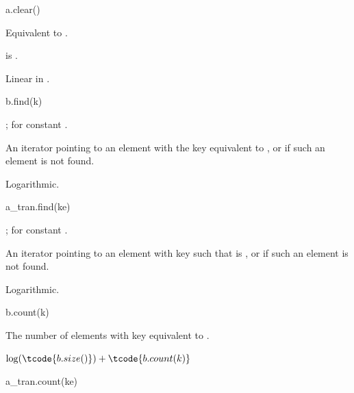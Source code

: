 %
\begin{itemdecl}
a.clear()
\end{itemdecl}

\begin{itemdescr}
\pnum
\effects
Equivalent to .

\pnum
\ensures
{} is .

\pnum
\complexity
Linear in .
\end{itemdescr}

%
\begin{itemdecl}
b.find(k)
\end{itemdecl}

\begin{itemdescr}
\pnum
\result
{};  for constant .

\pnum
\returns
An iterator pointing to an element with the key equivalent to , or
 if such an element is not found.

\pnum
\complexity
Logarithmic.
\end{itemdescr}

%
\begin{itemdecl}
a_tran.find(ke)
\end{itemdecl}

\begin{itemdescr}
\pnum
\result
{};  for constant .

\pnum
\returns
An iterator pointing to an element with key 
such that  is , or
 if such an element is not found.

\pnum
\complexity
Logarithmic.
\end{itemdescr}

%
\begin{itemdecl}
b.count(k)
\end{itemdecl}

\begin{itemdescr}
\pnum
\result
{}

\pnum
\returns
The number of elements with key equivalent to .

\pnum
\complexity
$\log (\tcode{b.size()}) + \tcode{b.count(k)}$
\end{itemdescr}

%
\begin{itemdecl}
a_tran.count(ke)
\end{itemdecl}

